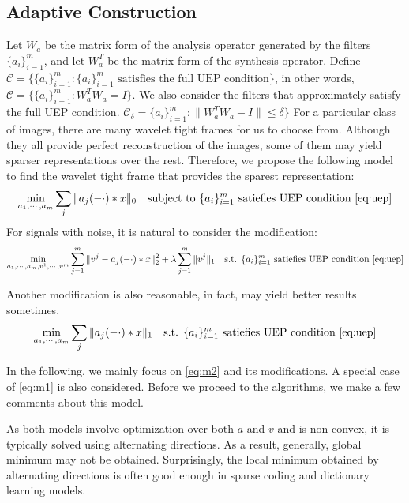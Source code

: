 \documentclass[a4paper]{article}
\begin{document}
\subsection{Adaptive Construction}
Let $W_a$ be the matrix form of the analysis operator generated by the filters $\{a_i\}_{i=1}^m$, and let $W^T_a$ be the matrix form of the synthesis operator. Define $\mathcal{C}=\{ \{a_i\}_{i=1}^m : \{a_i\}_{i=1}^m  \textrm{ satisfies the full UEP condition}\}$, in other words, $\mathcal{C}=\{ \{a_i\}_{i=1}^m : W_a^TW_a=I\}$. We also consider the filters that approximately satisfy the full UEP condition. $\mathcal{C}_\delta = \{a_i\}_{i=1}^m : \|W_a^TW_a -I\|\leq \delta\}$
For a particular class of images, there are many wavelet tight frames for us to choose from. Although they all provide perfect reconstruction of the images, some of them may yield sparser representations over the rest. Therefore, we propose the following model to find the wavelet tight frame that provides the sparest representation:
\begin{equation}
	\min_{a_1,\cdots,a_m} \sum_j \|a_j(-\cdot)*x\|_0 \quad \textrm{subject to } \{a_i\}_{i=1}^m \textrm{ satiefies UEP condition \eqref{eq:uep}}
\end{equation}
For signals with noise, it is natural to consider the modification:
\begin{equation}
\label{eq:m1}
	\min_{a_1,\cdots,a_m,v^1,\cdots,v^m}  \sum_{j=1}^m \|v^j - a_j(-\cdot)*x\|_2^2 + \lambda \sum_{j=1}^m \|v^j\|_1 \quad \textrm{s.t. } \{a_i\}_{i=1}^m \textrm{ satiefies UEP condition \eqref{eq:uep}}
\end{equation}

Another modification is also reasonable, in fact, may yield better results sometimes.
\begin{equation}
\label{eq:m2}
	\min_{a_1,\cdots,a_m}  \sum_j \|a_j(-\cdot)*x\|_1 \quad \textrm{s.t. } \{a_i\}_{i=1}^m \textrm{ satiefies UEP condition \eqref{eq:uep}}
\end{equation}

In the following, we mainly focus on \eqref{eq:m2} and its modifications. A special case of \eqref{eq:m1} is also considered.
Before we proceed to the algorithms, we make a few comments about this model. 

As both models involve optimization over both $a$ and $v$ and is non-convex, it is typically solved using alternating directions. As a result, generally, global minimum may not be obtained. Surprisingly, the local minimum obtained by alternating directions is often good enough in sparse coding and dictionary  learning models.
\end{document}
